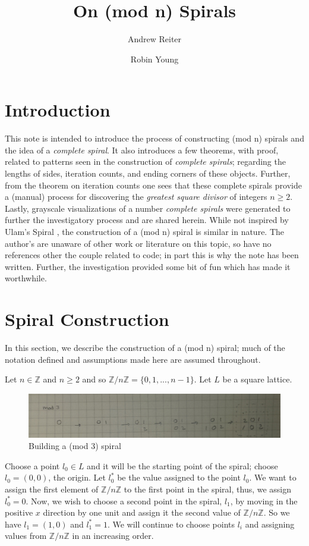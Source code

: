 \documentclass[11pt]{amsart}
\title{On (mod n) Spirals}
\author{Andrew Reiter}
\author{Robin Young}
\theoremstyle{mydef}
\begin{document}
\maketitle
\section{Introduction}
This note is intended to introduce the process of constructing (mod n) spirals and the idea of a \textit{complete spiral}.  It also introduces a few theorems, with proof, related to patterns seen in the construction of \textit{complete spirals}; regarding the lengths of sides, iteration counts, and ending corners of these objects. Further, from the theorem on iteration counts one sees that these complete spirals provide a (manual) process for discovering the \textit{greatest square divisor} of integers $n \ge 2$. Lastly, grayscale visualizations of a number \textit{complete spirals} were generated to further the investigatory process and are shared herein. While not inspired by Ulam's Spiral \cite{Ulam}, the construction of  a (mod n) spiral is similar in nature. The author's are unaware of other work or literature on this topic, so have no references other the couple related to code; in part this is why the note has been written. Further, the investigation provided some bit of fun which has made it worthwhile.

\section{Spiral Construction}
In this section, we describe the construction of a (mod n) spiral; much of the notation defined and assumptions made here are assumed throughout.

Let $n \in \mathbb{Z}$ and $n \ge 2$ and so $\mathbb{Z}/n\mathbb{Z} = \{ 0, 1, ..., n-1 \}$. Let $L$ be a square lattice. 

\begin{figure}[h]
\centering
\includegraphics[scale=0.3]{mod3basic.png}
\caption{Building a (mod 3) spiral}
\label{fig:mod3spiral}
\end{figure}

Choose a point $l_0 \in L$ and it will be the starting point of the spiral; choose $l_0 = (0, 0)$, the origin. Let $l^*_0$ be the value assigned to the point $l_0$. We want to assign the first element of $\mathbb{Z}/n\mathbb{Z}$ to the first point in the spiral, thus, we assign $l^*_0 = 0$. Now, we wish to choose a second point in the spiral, $l_1$, by moving in the positive $x$ direction by one unit and assign it the second value of $\mathbb{Z}/n\mathbb{Z}$. So we have $l_1 = (1, 0)$ and $l^*_1 = 1$.  We will continue to choose points $l_i$ and assigning values from $\mathbb{Z}/n\mathbb{Z}$ in an increasing order.
\end{document}
